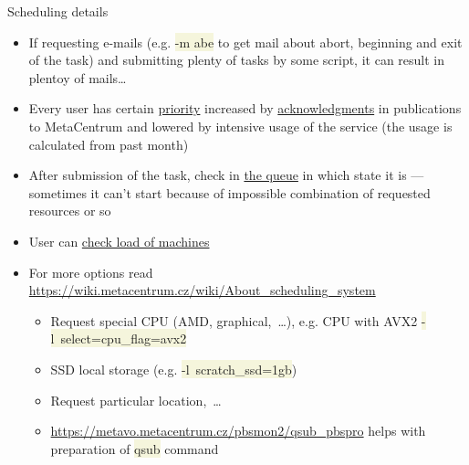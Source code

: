 \documentclass[compress, ucs, xelatex, 11pt, xcolor=svgnames, aspectratio=169,
	hyperref={
		bookmarks=true,
		unicode=true,
		colorlinks=true,
		pdftitle={Linux, command line and MetaCentrum},
		plainpages=false,
		pdfauthor={Vojtech Zeisek},
		pdfsubject={Course about use of Linux command line, writing shell scripts and using MetaCentrum of CESNET},
		pdfcreator={XeLaTeX},
		pdfkeywords={Linux, GNU, BASH, shell, command line, MetaCentrum},
		linkcolor=DarkRed, %
		anchorcolor=DarkBlue, %
		citecolor=Indigo, %
		filecolor=NavyBlue, %
		menucolor=DarkMagenta, %
		urlcolor=DarkBlue, %
		pdftex},
	url={hyphens, lowtilde} %
	]{beamer}
\renewcommand{\texttt}[1]{\colorbox{Beige}{{\ttfamily #1}}}
\begin{document}
\begin{frame}[allowframebreaks]{Scheduling details}
\begin{itemize}
		\item If requesting e-mails (e.g. \texttt{-m abe} to get mail about abort, beginning and exit of the task) and submitting plenty of tasks by some script, it can result in plentoy of mails\ldots
		\item Every user has certain \href{https://metavo.metacentrum.cz/pbsmon2/users/}{priority} increased by \href{https://wiki.metacentrum.cz/wiki/Usage_rules/Acknowledgement}{acknowledgments} in publications to MetaCentrum and lowered by intensive usage of the service (the usage is calculated from past month)
		\item After submission of the task, check in \href{https://metavo.metacentrum.cz/pbsmon2/queues/jobsQueued}{the queue} in which state it is --- sometimes it can't start because of impossible combination of requested resources or so
		\item User can \href{https://metavo.metacentrum.cz/pbsmon2/nodes/physical}{check load of machines}
		\item For more options read \url{https://wiki.metacentrum.cz/wiki/About_scheduling_system}
		\begin{itemize}
			\item Request special CPU (AMD, graphical,~\ldots), e.g. CPU with AVX2 \texttt{-l~select=cpu\_flag=avx2}
			\item SSD local storage (e.g. \texttt{-l~scratch\_ssd=1gb})
			\item Request particular location,~\ldots
			\item \url{https://metavo.metacentrum.cz/pbsmon2/qsub_pbspro} helps with preparation of \texttt{qsub} command
		\end{itemize}
	\end{itemize}
\end{frame}
\end{document}
